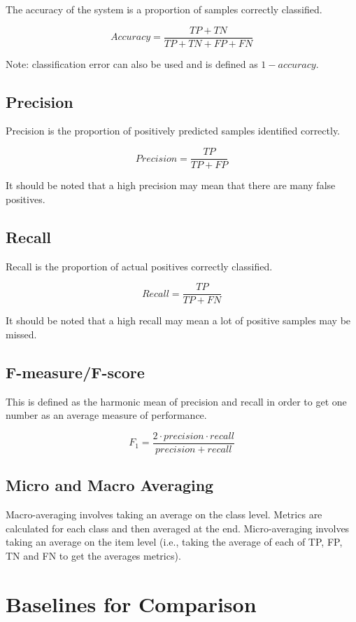 The accuracy of the system is a proportion of samples correctly classified.

$$ Accuracy = \frac{TP + TN}{TP + TN + FP + FN} $$

Note: classification error can also be used and is defined as $ 1 - accuracy $.

\subsection{Precision}

Precision is the proportion of positively predicted samples identified correctly.

$$ Precision = \frac{TP}{TP + FP} $$

It should be noted that a high precision may mean that there are many false positives.

\subsection{Recall}

Recall is the proportion of actual positives correctly classified.

$$ Recall = \frac{TP}{TP + FN} $$

It should be noted that a high recall may mean a lot of positive samples may be missed.

\subsection{F-measure/F-score}

This is defined as the harmonic mean of precision and recall in order to get one number as an average measure of performance.

$$ F_1 = \frac{2 \cdot precision \cdot recall}{precision + recall} $$

\subsection{Micro and Macro Averaging} \label{ssec:eval_metric_averaging}

Macro-averaging involves taking an average on the class level. Metrics are calculated for each class and then averaged at the end. Micro-averaging involves taking an average on the item level (i.e., taking the average of each of TP, FP, TN and FN to get the averages metrics).

\section{Baselines for Comparison}

